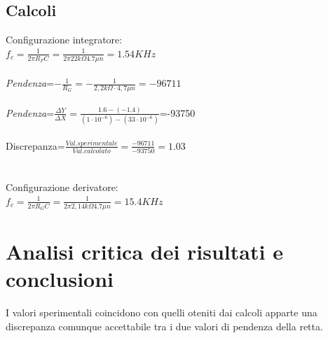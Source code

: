 \documentclass[12pt]{article}
\begin{document}
\subsection{Calcoli}
Configurazione integratore:\\
$f_c=\frac{1}{2 \pi R_F C}=\frac{1}{2 \pi 22 k\Omega 4.7\mu n }=1.54KHz$\\
\\
\textit{Pendenza}=$-\frac{1}{R_G}=-\frac{1}{2,2k\Omega \cdot 4,7 \mu n}=-96711 $\\
\\
\textit{Pendenza}=$\frac{\Delta Y}{\Delta X}=\frac{1.6-(-1.4)}{(1\cdot 10^{-6})-(33\cdot 10^{-6})}$=-93750\\
\\
Discrepanza=$\frac{Val. sperimentale}{Val. calcolato}=\frac{-96711}{-93750}=1.03$\\
\\
\\
Configurazione derivatore:\\
$f_c=\frac{1}{2 \pi R_G C}=\frac{1}{2 \pi 2,14 k\Omega 4.7\mu n }=15.4KHz$\\
\section{Analisi critica dei risultati e conclusioni}
I valori sperimentali coincidono con quelli  oteniti dai calcoli apparte una discrepanza comunque accettabile
tra i due valori di pendenza della retta.\\
\end{document}
